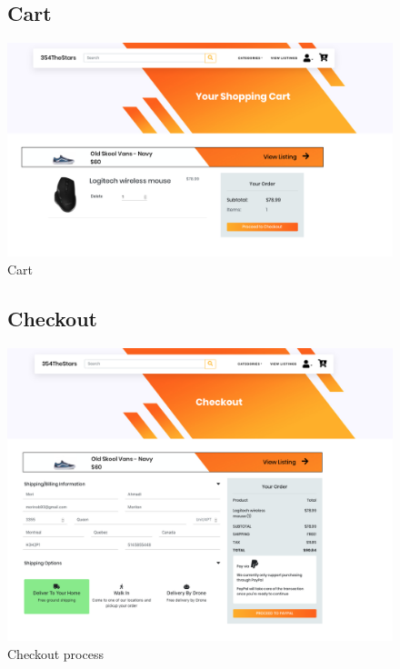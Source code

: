 \documentclass[11pt]{article}
\begin{document}
\begin{figure}[ht!]
    \subsection{Cart}
    \centering
    \includegraphics[width=\textwidth,height=0.3\paperheight,keepaspectratio]{Diagrams/External_Interfaces/Cart.png}
    \caption{Cart}
    \label{fig: Latest listings}
\end{figure}
\FloatBarrier

\begin{figure}[ht!]
    \subsection{Checkout}
    \centering
    \includegraphics[width=\textwidth,height=0.3\paperheight,keepaspectratio]{Diagrams/External_Interfaces/Checkout.png}
    \caption{Checkout process}
    \label{fig: Latest listings}
\end{figure}
\FloatBarrier
\end{document}
